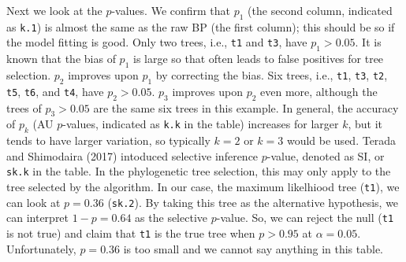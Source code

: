 \documentclass[a4paper]{amsart}
\begin{document}
Next we look at the $p$-values. We confirm that $p_1$ (the second
column, indicated as {\tt k.1}) is almost the same as the raw BP (the first column); this
should be so if the model fitting is good. Only two trees, i.e., {\tt t1}
and {\tt t3}, have $p_1>0.05$. It is known that the bias of $p_1$ is large
so that often leads to false positives for tree selection. $p_2$
improves upon $p_1$ by correcting the bias. Six trees, i.e., {\tt t1}, {\tt t3},
{\tt t2}, {\tt t5}, {\tt t6}, and {\tt t4}, have $p_2>0.05$. $p_3$ improves upon $p_2$ even
more, although the trees of $p_3>0.05$ are the same six trees in this
example. In general, the accuracy of $p_k$ (AU $p$-values, indicated as {\tt k.k} in the table) increases for larger $k$, but it tends to have larger variation, so typically $k=2$ or $k=3$ would be used.
Terada and Shimodaira (2017) intoduced selective inference $p$-value, denoted as SI, or {\tt sk.k} in the table. In the phylogenetic tree selection, this may only apply to the tree selected by the algorithm. In our case, the maximum likelhiood tree ({\tt t1}), we can look at $p=0.36$ ({\tt sk.2}).  By taking this tree as the alternative hypothesis, we can interpret $1-p = 0.64$ as the selective $p$-value. So, we can reject the null ({\tt t1} is not true) and claim that {\tt t1} is the true tree when $p>0.95$ at $\alpha=0.05$. Unfortunately, $p=0.36$ is too small and we cannot say anything in this table.
\end{document}

